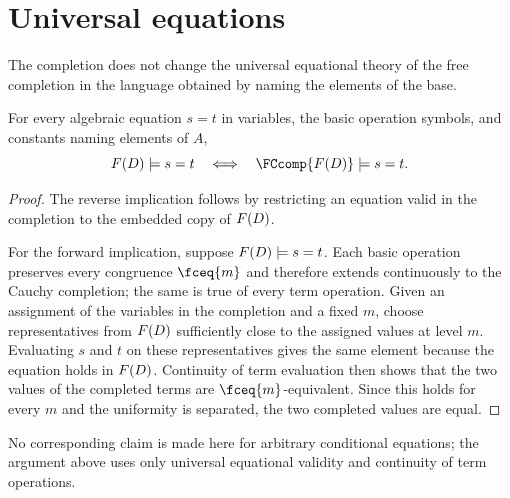 \section{Universal equations}\label{sec:equations}

The completion does not change the universal equational theory of the free
completion in the language obtained by naming the elements of the base.

\begin{theorem}
\label{thm:equational-conservativity}
For every algebraic equation $s=t$ in variables, the basic operation symbols,
and constants naming elements of $A$,
\[
 \Free D\models s=t
 \quad\Longleftrightarrow\quad
 \FCcomp{\Free D}\models s=t.
\]
\end{theorem}

\begin{proof}
The reverse implication follows by restricting an equation valid in the
completion to the embedded copy of $F(D)$.

For the forward implication, suppose $F(D)\models s=t$.  Each basic
operation preserves every congruence $\fceq{m}$ and therefore extends
continuously to the Cauchy completion; the same is true of every term
operation.  Given an assignment of the variables in the completion and a fixed
$m$, choose representatives from $F(D)$ sufficiently close to the assigned
values at level $m$.  Evaluating $s$ and $t$ on these representatives gives the
same element because the equation holds in $F(D)$.  Continuity of term
evaluation then shows that the two values of the completed terms are
$\fceq{m}$-equivalent.  Since this holds for every $m$ and the uniformity is
separated, the two completed values are equal.
\end{proof}

No corresponding claim is made here for arbitrary conditional equations; the
argument above uses only universal equational validity and continuity of term
operations.
